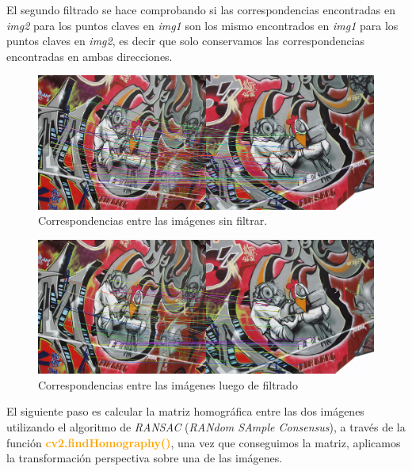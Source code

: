 \documentclass[11pt, a4paper]{article}
\begin{document}
	

	El segundo filtrado se hace comprobando si las correspondencias encontradas en \textit{img2} para los puntos claves en \textit{img1} son los mismo encontrados en \textit{img1} para los puntos claves en \textit{img2}, es decir que solo conservamos las correspondencias encontradas en ambas direcciones.
	
	
	
	\begin{figure}[H]
		\centering
		\includegraphics[width=\textwidth]{Imagenes/sift_mtch_nf.png}
		\caption{Correspondencias entre las imágenes sin filtrar.}
		\label{fig:sift_mtch_nf}
	\end{figure} 
	
	\begin{figure}[H]
		\centering
		\includegraphics[width=\textwidth]{Imagenes/sift_mtch.png}
		\caption{Correspondencias entre las imágenes luego de filtrado}
		\label{fig:sift_mtch}
	\end{figure} 
	
	El siguiente paso es calcular la matriz homográfica entre las dos imágenes utilizando el algoritmo de \textit{RANSAC} (\textit{RANdom SAmple Consensus}), a través de la función \textcolor{orange}{\textbf{cv2.findHomography()}}, una vez que conseguimos la matriz, aplicamos la transformación perspectiva sobre una de las imágenes.
\end{document}
